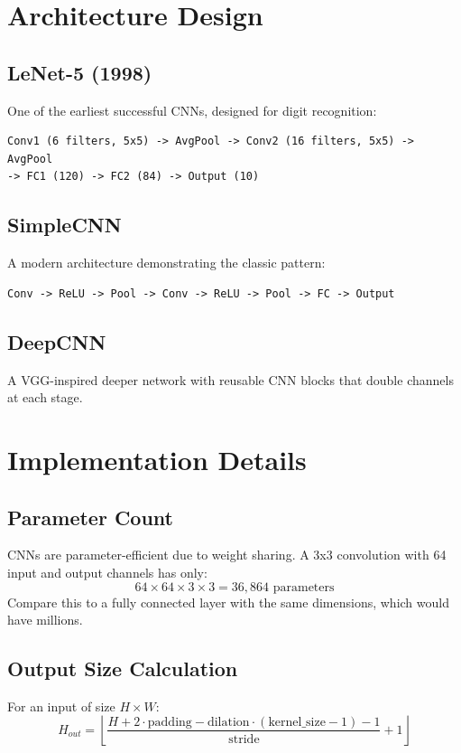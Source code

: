 \documentclass[12pt]{article}
\begin{document}
\section{Architecture Design}

\subsection{LeNet-5 (1998)}
One of the earliest successful CNNs, designed for digit recognition:
\begin{verbatim}
Conv1 (6 filters, 5x5) -> AvgPool -> Conv2 (16 filters, 5x5) -> AvgPool
-> FC1 (120) -> FC2 (84) -> Output (10)
\end{verbatim}

\subsection{SimpleCNN}
A modern architecture demonstrating the classic pattern:
\begin{verbatim}
Conv -> ReLU -> Pool -> Conv -> ReLU -> Pool -> FC -> Output
\end{verbatim}

\subsection{DeepCNN}
A VGG-inspired deeper network with reusable CNN blocks that double channels at each stage.

\section{Implementation Details}

\subsection{Parameter Count}
CNNs are parameter-efficient due to weight sharing. A 3x3 convolution with 64 input and output channels has only:
\begin{equation}
    64 \times 64 \times 3 \times 3 = 36,864 \text{ parameters}
\end{equation}
Compare this to a fully connected layer with the same dimensions, which would have millions.

\subsection{Output Size Calculation}
For an input of size $H \times W$:
\begin{equation}
    H_{out} = \left\lfloor\frac{H + 2 \cdot \text{padding} - \text{dilation} \cdot (\text{kernel\_size} - 1) - 1}{\text{stride}} + 1\right\rfloor
\end{equation}
\end{document}
